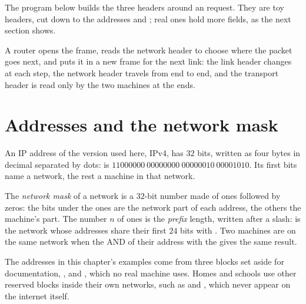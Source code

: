 The program below builds the three headers around an  request. They are toy headers, cut down to the addresses
and ; real ones hold more fields, as the next section shows.

\label{lst:g11:network-protocols:encapsulate}

\label{out:g11:network-protocols:encapsulate}

A router opens the frame, reads the network header to choose where the packet goes next, and puts it in a new frame
for the next link: the link header changes at each step, the network header travels from end to end, and the
transport header is read only by the two machines at the ends.

\section{Addresses and the network mask}\label{sec:g11:network-protocols:addresses}

An IP address of the version used here, IPv4, has $32$ bits, written as four bytes in decimal separated by dots:
 is $11000000\ 00000000\ 00000010\ 00001010$. Its first bits name a network, the rest a machine in
that network.

\begin{definition}\label{def:g11:network-protocols:ip-address}
The \emph{network mask} of a network is a $32$-bit number made of ones followed by zeros: the
bits under the ones are the network part of each address, the others the machine's part. The number $n$ of ones is
the \emph{prefix} length, written after a slash:  is the network whose addresses share
their first $24$ bits with . Two machines are on the same network when the AND of their address with
the  gives the same result.
\end{definition}

The addresses in this chapter's examples come from three blocks set aside for documentation, ,
 and , which no real machine uses. Homes and schools use other reserved
blocks inside their own networks, such as  and , which never appear on the
internet itself.

